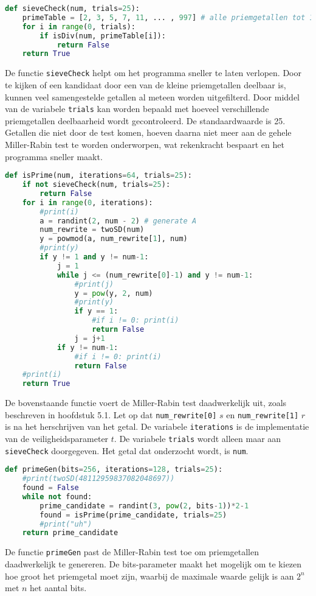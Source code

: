 \documentclass{report} %
\let\code\lstinline
\begin{document}
\begin{lstlisting}[language=Python, firstnumber=22]
def sieveCheck(num, trials=25):
    primeTable = [2, 3, 5, 7, 11, ... , 997] # alle priemgetallen tot 1000
    for i in range(0, trials):
        if isDiv(num, primeTable[i]):
            return False
    return True
\end{lstlisting}
De functie \code{sieveCheck} helpt om het programma sneller te laten verlopen. Door te kijken of een kandidaat door een van de kleine priemgetallen deelbaar is, kunnen veel samengestelde getallen al meteen worden uitgefilterd. Door middel van de variabele \code{trials} kan worden bepaald met hoeveel verschillende priemgetallen deelbaarheid wordt gecontroleerd. De standaardwaarde is 25. Getallen die niet door de test komen, hoeven daarna niet meer aan de gehele Miller-Rabin test te worden onderworpen, wat rekenkracht bespaart en het programma sneller maakt.\\

\begin{lstlisting}[language=Python, firstnumber=28]
def isPrime(num, iterations=64, trials=25):
    if not sieveCheck(num, trials=25):
        return False
    for i in range(0, iterations):
        #print(i)
        a = randint(2, num - 2) # generate A
        num_rewrite = twoSD(num)
        y = powmod(a, num_rewrite[1], num)
        #print(y)
        if y != 1 and y != num-1:
            j = 1
            while j <= (num_rewrite[0]-1) and y != num-1:
                #print(j)
                y = pow(y, 2, num)
                #print(y)
                if y == 1:
                    #if i != 0: print(i)
                    return False
                j = j+1
            if y != num-1:
                #if i != 0: print(i)
                return False
    #print(i)
    return True
\end{lstlisting}
De bovenstaande functie voert de Miller-Rabin test daadwerkelijk uit, zoals beschreven in hoofdstuk 5.1. Let op dat \code{num_rewrite[0]} $s $ en \code{num_rewrite[1]} $r$ is na het herschrijven van het getal. De variabele \code{iterations} is de implementatie van de veiligheidsparameter $t$. De variabele \code{trials} wordt alleen maar aan \code{sieveCheck} doorgegeven. Het getal dat onderzocht wordt, is \code{num}.\\

\begin{lstlisting}[language=Python, firstnumber=52]
def primeGen(bits=256, iterations=128, trials=25):
    #print(twoSD(48112959837082048697))
    found = False
    while not found:
        prime_candidate = randint(3, pow(2, bits-1))*2-1
        found = isPrime(prime_candidate, trials=25)
        #print("uh")
    return prime_candidate
\end{lstlisting}
De functie \code{primeGen} past de Miller-Rabin test toe om priemgetallen daadwerkelijk te genereren. De bits-parameter maakt het mogelijk om te kiezen hoe groot het priemgetal moet zijn, waarbij de maximale waarde gelijk is aan $2^n$ met $n$ het aantal bits.
\end{document}
